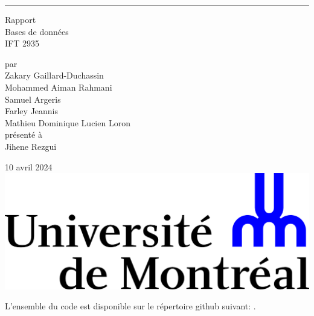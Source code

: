 \documentclass{article}
\begin{document}
\begin{titlepage}
  \centering
  
  \rule{\textwidth}{0px}
  \vspace{15mm}
  
  \Huge{Rapport} \\
  \vspace{5mm}
  \Large Bases de données \\
  IFT 2935
  
  \vspace{40mm}
  \large par \\ \vspace{3mm}
  Zakary Gaillard-Duchassin\\ \vspace{3mm}
  Mohammed Aiman Rahmani \\ \vspace{3mm}
  Samuel Argeris \\ \vspace{3mm}
  Farley Jeannis \\ \vspace{3mm}
  Mathieu Dominique Lucien Loron \\ \vspace{3mm}
  \vspace{30mm}
  présenté à \\ \vspace{3mm}
  Jihene Rezgui
  
  \vfill
  10 avril 2024 \\ \vspace{3mm}
  \includegraphics[scale=0.55]{logo-udem.png}
\end{titlepage}
\newpage

\noindent
L'ensemble du code est disponible sur le répertoire github suivant:
\href{https://github.com/ZGaillard/projet\_session\_2935}{}.
\end{document}
